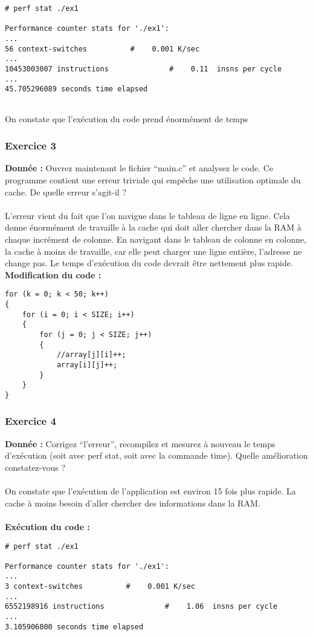 \begin{lstlisting}
# perf stat ./ex1 

Performance counter stats for './ex1':
...        
56 context-switches          #    0.001 K/sec                  
... 
10453003007 instructions              #    0.11  insns per cycle        
...
45.705296089 seconds time elapsed


\end{lstlisting}
On constate que l'exécution du code prend énormément de temps

\subsubsection{Exercice 3}
\textbf{Donnée : } Ouvrez	maintenant	le	fichier	“main.c”	et	analysez	le	code.
Ce	programme	contient	une	erreur	triviale	qui	empêche	une	utilisation	optimale	du	cache.	De	quelle	
erreur	s'agit-il	?\\\\
L'erreur vient du fait que l'on navigue dans le tableau de ligne en ligne. Cela donne énormément de travaille à la cache qui doit aller chercher dans la RAM à chaque incrément de colonne.
En navigant dans le tableau de colonne en colonne, la cache à moins de travaille, car elle peut charger une ligne entière, l'adresse ne change pas. Le temps d'exécution du code devrait être nettement plus rapide.\\

\textbf{Modification du code : } \\
\begin{lstlisting}
for (k = 0; k < 50; k++)
{
	for (i = 0; i < SIZE; i++)
	{
		for (j = 0; j < SIZE; j++)
		{
			//array[j][i]++;
			array[i][j]++;
		}
	}
}
\end{lstlisting}

\subsubsection{Exercice 4}
\textbf{Donnée : } Corrigez	“l'erreur”,	recompilez	et	mesurez	à	nouveau	le	temps	d'exécution	(soit	avec	perf	stat,	soit	
avec	la	commande	time).	Quelle	amélioration	constatez-vous	?\\\\
On constate que l'exécution de l'application est environ 15 fois plus rapide. La cache à moins besoin d'aller chercher des informations dans la RAM.\\\\
\textbf{Exécution du code : } \\
\begin{lstlisting}
# perf stat ./ex1 

Performance counter stats for './ex1':
...      
3 context-switches          #    0.001 K/sec                  
...  
6552198916 instructions              #    1.06  insns per cycle        
...
3.105906000 seconds time elapsed

\end{lstlisting}

